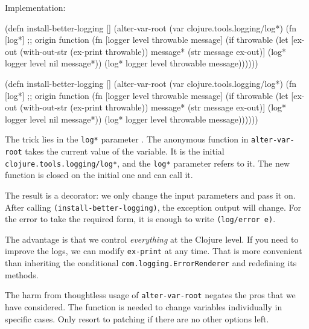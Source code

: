 \noindent
Implementation:


\ifx\DEVICETYPE\MOBILE

\begin{clojure/lines}
(defn install-better-logging []
  (alter-var-root
   (var clojure.tools.logging/log*)
   (fn [log*] ;; origin function
     (fn [logger level
          throwable message]
       (if throwable
         (let [ex-out (with-out-str
                        (ex-print
                          throwable))
               message* (str message
                          \newline
                          ex-out)]
           (log* logger
             level nil message*))
           (log* logger level
             throwable message))))))
\end{clojure/lines}

\else

\begin{clojure/lines}
(defn install-better-logging []
  (alter-var-root
   (var clojure.tools.logging/log*)
   (fn [log*] ;; origin function
     (fn [logger level throwable message]
       (if throwable
         (let [ex-out (with-out-str (ex-print throwable))
               message* (str message \newline ex-out)]
           (log* logger level nil message*))
         (log* logger level throwable message))))))
\end{clojure/lines}

\fi

\mnoindent
The trick lies in the \verb|log*| parameter . The anonymous function in \verb|alter-var-root| takes the current value of the variable. It is the initial \verb|clojure.tools.logging/log*|, and the \verb|log*| parameter refers to it.
The new function is closed on the initial one and can call it.

The result is a decorator: we only change the input parameters and pass it on. After calling \verb|(install-better-logging)|, the exception output will change.
For the error to take the required form, it is enough to write \verb|(log/error e)|.

The advantage is that we control \emph{everything} at the Clojure level.
If you need to improve the logs, we can modify \verb|ex-print| at any time.
That is more convenient than inheriting the conditional \verb|com.logging.ErrorRenderer| and redefining its methods.

The harm from thoughtless usage of \verb|alter-var-root| negates the pros that we have considered.
The function is needed to change variables individually in specific cases.
Only resort to patching if there are no other options left.

